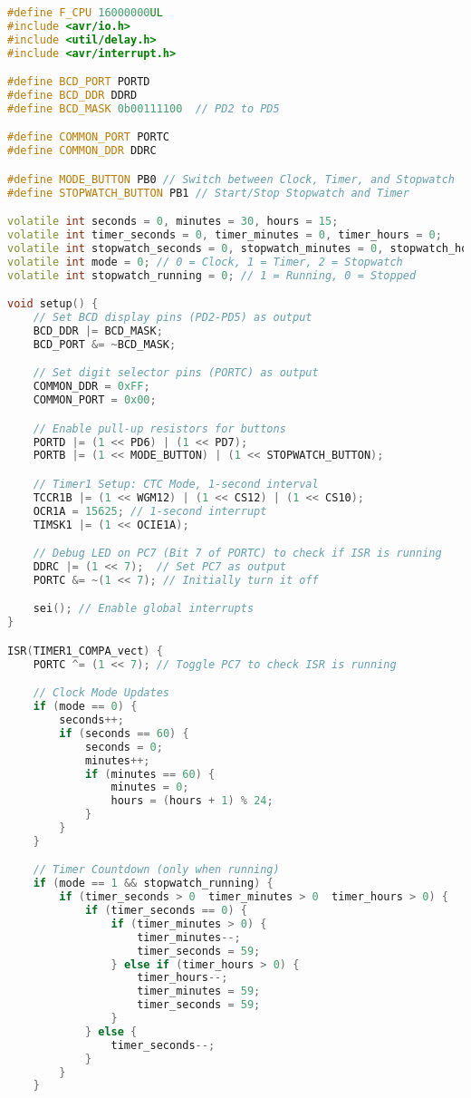 \documentclass[a4paper,12pt]{article}
\theoremstyle{remark}
\begin{document}
\begin{lstlisting}[language=C++, caption= 'Code for Digital Clock']
#define F_CPU 16000000UL
#include <avr/io.h>
#include <util/delay.h>
#include <avr/interrupt.h>

#define BCD_PORT PORTD
#define BCD_DDR DDRD
#define BCD_MASK 0b00111100  // PD2 to PD5

#define COMMON_PORT PORTC
#define COMMON_DDR DDRC

#define MODE_BUTTON PB0 // Switch between Clock, Timer, and Stopwatch
#define STOPWATCH_BUTTON PB1 // Start/Stop Stopwatch and Timer

volatile int seconds = 0, minutes = 30, hours = 15;
volatile int timer_seconds = 0, timer_minutes = 0, timer_hours = 0;
volatile int stopwatch_seconds = 0, stopwatch_minutes = 0, stopwatch_hours = 0;
volatile int mode = 0; // 0 = Clock, 1 = Timer, 2 = Stopwatch
volatile int stopwatch_running = 0; // 1 = Running, 0 = Stopped

void setup() {
    // Set BCD display pins (PD2-PD5) as output
    BCD_DDR |= BCD_MASK;
    BCD_PORT &= ~BCD_MASK;

    // Set digit selector pins (PORTC) as output
    COMMON_DDR = 0xFF;
    COMMON_PORT = 0x00;

    // Enable pull-up resistors for buttons
    PORTD |= (1 << PD6) | (1 << PD7);
    PORTB |= (1 << MODE_BUTTON) | (1 << STOPWATCH_BUTTON);

    // Timer1 Setup: CTC Mode, 1-second interval
    TCCR1B |= (1 << WGM12) | (1 << CS12) | (1 << CS10);
    OCR1A = 15625; // 1-second interrupt
    TIMSK1 |= (1 << OCIE1A);

    // Debug LED on PC7 (Bit 7 of PORTC) to check if ISR is running
    DDRC |= (1 << 7);  // Set PC7 as output
    PORTC &= ~(1 << 7); // Initially turn it off

    sei(); // Enable global interrupts
}

ISR(TIMER1_COMPA_vect) {
    PORTC ^= (1 << 7); // Toggle PC7 to check ISR is running

    // Clock Mode Updates
    if (mode == 0) {
        seconds++;
        if (seconds == 60) {
            seconds = 0;
            minutes++;
            if (minutes == 60) {
                minutes = 0;
                hours = (hours + 1) % 24;
            }
        }
    }

    // Timer Countdown (only when running)
    if (mode == 1 && stopwatch_running) {  
        if (timer_seconds > 0  timer_minutes > 0  timer_hours > 0) {
            if (timer_seconds == 0) {
                if (timer_minutes > 0) {
                    timer_minutes--;
                    timer_seconds = 59;
                } else if (timer_hours > 0) {
                    timer_hours--;
                    timer_minutes = 59;
                    timer_seconds = 59;
                }
            } else {
                timer_seconds--;
            }
        }
    }


\end{lstlisting}
\end{document}
